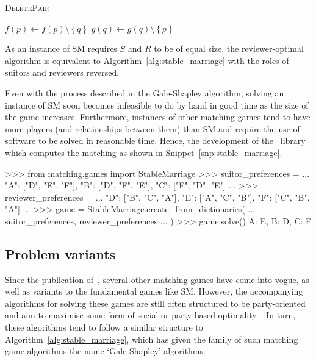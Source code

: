 \balg%
\caption{\textsc{DeletePair}}\label{alg:delete}
\vspace{1em}

\(f(p) \gets f(p) \setminus \left\{q\right\}\)\;
\(g(q) \gets g(q) \setminus \left\{p\right\}\)\;
\ealg%

As an instance of SM requires \(S\) and \(R\) to be of equal size, the
reviewer-optimal algorithm is equivalent to Algorithm~\ref{alg:stable_marriage}
with the roles of suitors and reviewers reversed.

Even with the process described in the Gale-Shapley algorithm, solving an
instance of SM soon becomes infeasible to do by hand in good time as the size of
the game increases. Furthermore, instances of other matching games tend to have
more players (and relationships between them) than SM and require the use of
software to be solved in reasonable time. Hence, the development of the
\matching\ library which computes the matching as shown in
Snippet~\ref{snp:stable_marriage}.

\begin{listing}[htbp]
\begin{usagepy}
>>> from matching.games import StableMarriage
>>> suitor_preferences = {
...     "A": ["D", "E", "F"], "B": ["D", "F", "E"], "C": ["F", "D", "E"]
... }
>>> reviewer_preferences = {
...     "D": ["B", "C", "A"], "E": ["A", "C", "B"], "F": ["C", "B", "A"]
... }
>>> game = StableMarriage.create_from_dictionaries(
...     suitor_preferences, reviewer_preferences
... )
>>> game.solve()
{A: E, B: D, C: F}

\end{usagepy}
\caption{%
    Solving the game from Figure~\ref{fig:sm_matching} in \matching
}\label{snp:stable_marriage}
\end{listing}

\subsection{Problem variants}

Since the publication of~\cite{Gale1962}, several other matching games have come
into vogue, as well as variants to the fundamental games like SM. However, the
accompanying algorithms for solving these games are still often structured to be
party-oriented and aim to maximise some form of social or party-based
optimality~\cite{Fuku2006,Gale1962}. In turn, these algorithms tend to follow a
similar structure to Algorithm~\ref{alg:stable_marriage}, which has given the
family of such matching game algorithms the name `Gale-Shapley' algorithms.

